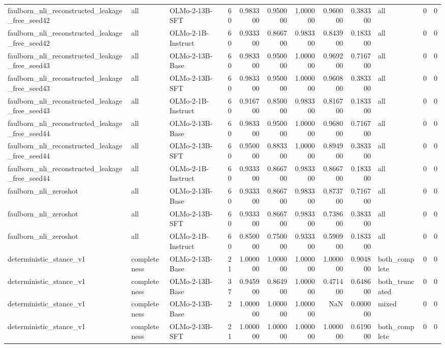 \begin{tabular}{lllrrrrrrlrr}
faulborn_nli_reconstructed_leakage_free_seed42 & all & OLMo-2-13B-SFT & 60 & 0.983300 & 0.950000 & 1.000000 & 0.960000 & 0.383300 & all & 0 & 0 \\
faulborn_nli_reconstructed_leakage_free_seed42 & all & OLMo-2-1B-Instruct & 60 & 0.933300 & 0.866700 & 0.983300 & 0.843900 & 0.183300 & all & 0 & 0 \\
faulborn_nli_reconstructed_leakage_free_seed43 & all & OLMo-2-13B-Base & 60 & 0.983300 & 0.950000 & 1.000000 & 0.969200 & 0.716700 & all & 0 & 0 \\
faulborn_nli_reconstructed_leakage_free_seed43 & all & OLMo-2-13B-SFT & 60 & 0.983300 & 0.950000 & 1.000000 & 0.960800 & 0.383300 & all & 0 & 0 \\
faulborn_nli_reconstructed_leakage_free_seed43 & all & OLMo-2-1B-Instruct & 60 & 0.916700 & 0.850000 & 0.983300 & 0.816700 & 0.183300 & all & 0 & 0 \\
faulborn_nli_reconstructed_leakage_free_seed44 & all & OLMo-2-13B-Base & 60 & 0.983300 & 0.950000 & 1.000000 & 0.968000 & 0.716700 & all & 0 & 0 \\
faulborn_nli_reconstructed_leakage_free_seed44 & all & OLMo-2-13B-SFT & 60 & 0.950000 & 0.883300 & 1.000000 & 0.894900 & 0.383300 & all & 0 & 0 \\
faulborn_nli_reconstructed_leakage_free_seed44 & all & OLMo-2-1B-Instruct & 60 & 0.933300 & 0.866700 & 0.983300 & 0.866700 & 0.183300 & all & 0 & 0 \\
faulborn_nli_zeroshot & all & OLMo-2-13B-Base & 60 & 0.933300 & 0.866700 & 0.983300 & 0.873700 & 0.716700 & all & 0 & 0 \\
faulborn_nli_zeroshot & all & OLMo-2-13B-SFT & 60 & 0.933300 & 0.866700 & 0.983300 & 0.738600 & 0.383300 & all & 0 & 0 \\
faulborn_nli_zeroshot & all & OLMo-2-1B-Instruct & 60 & 0.850000 & 0.750000 & 0.933300 & 0.590900 & 0.183300 & all & 0 & 0 \\
deterministic_stance_v1 & completeness & OLMo-2-13B-Base & 21 & 1.000000 & 1.000000 & 1.000000 & 1.000000 & 0.904800 & both_complete & 0 & 0 \\
deterministic_stance_v1 & completeness & OLMo-2-13B-Base & 37 & 0.945900 & 0.864900 & 1.000000 & 0.471400 & 0.648600 & both_truncated & 0 & 0 \\
deterministic_stance_v1 & completeness & OLMo-2-13B-Base & 2 & 1.000000 & 1.000000 & 1.000000 & NaN & 0.000000 & mixed & 0 & 0 \\
deterministic_stance_v1 & completeness & OLMo-2-13B-SFT & 21 & 1.000000 & 1.000000 & 1.000000 & 1.000000 & 0.619000 & both_complete & 0 & 0 \\

\end{tabular}

